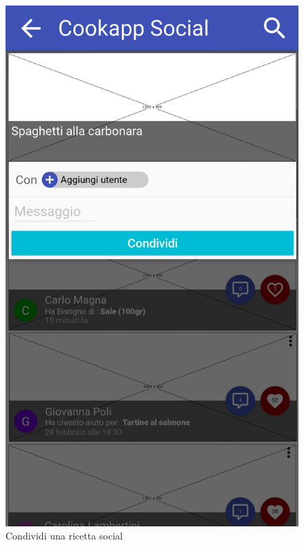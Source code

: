 \begin{figure}[H]
\begin{minipage}{.49\textwidth}
		\includegraphics[width=\textwidth]{img/wireframe/condividi_ricetta_selezionata.png}
		\caption{Condividi una ricetta social}
	\end{minipage}
\end{figure}
